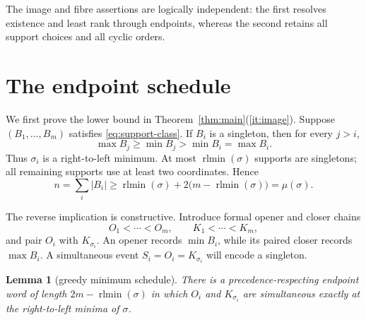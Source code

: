 \documentclass[a4paper,10pt]{amsart}
\newtheorem{lemma}[theorem]{Lemma}
\theoremstyle{remark}
\newcommand{\rtlmin}{\operatorname{rlmin}}
\begin{document}
The image and fibre assertions are logically independent: the first resolves
existence and least rank through endpoints, whereas the second retains all
support choices and all cyclic orders.

\section{The endpoint schedule}\label{sec:image}

We first prove the lower bound in Theorem~\ref{thm:main}(\ref{it:image}).
Suppose $(B_1,\ldots,B_m)$ satisfies \eqref{eq:support-class}.  If $B_i$ is a
singleton, then for every $j>i$,
\[
 \max B_j\ge\min B_j>\min B_i=\max B_i.
\]
Thus $\sigma_i$ is a right-to-left minimum.  At most
$\rtlmin(\sigma)$ supports are singletons; all remaining supports use at least
two coordinates.  Hence
\[
 n=\sum_i|B_i|\ge\rtlmin(\sigma)+
 2\bigl(m-\rtlmin(\sigma)\bigr)=\mu(\sigma).
\]

The reverse implication is constructive.  Introduce formal opener and closer
chains
\begin{equation}\label{eq:chains}
 O_1<\cdots<O_m,\qquad K_1<\cdots<K_m,
\end{equation}
and pair $O_i$ with $K_{\sigma_i}$.  An opener records $\min B_i$, while its
paired closer records $\max B_i$.  A simultaneous event $S_i=O_i=K_{\sigma_i}$
will encode a singleton.

\begin{lemma}[greedy minimum schedule]\label{lem:schedule}
There is a precedence-respecting endpoint word of length
$2m-\rtlmin(\sigma)$ in which $O_i$ and $K_{\sigma_i}$ are simultaneous
exactly at the right-to-left minima of $\sigma$.
\end{lemma}
\end{document}
